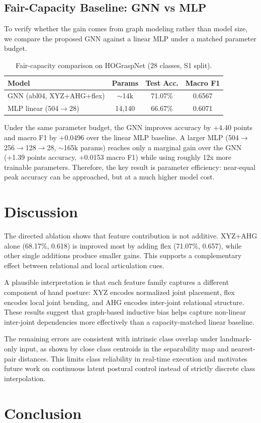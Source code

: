 \documentclass[letterpaper, 10 pt, conference]{ieeeconf}  %
\begin{document}
\subsection{Fair-Capacity Baseline: GNN vs MLP}

To verify whether the gain comes from graph modeling rather than model size, we compare the proposed GNN against a linear MLP under a matched parameter budget.

\begin{table}[h]
\centering
\caption{Fair-capacity comparison on HOGraspNet (28 classes, S1 split).}
\label{tab:fair_capacity}
\begin{tabular}{lccc}
\toprule
Model & Params & Test Acc. & Macro F1 \\
\midrule
GNN (abl04, XYZ+AHG+flex) & \(\sim\)14k & 71.07\% & 0.6567 \\
MLP linear (504\(\rightarrow\)28) & 14,140 & 66.67\% & 0.6071 \\
\bottomrule
\end{tabular}
\end{table}

Under the same parameter budget, the GNN improves accuracy by +4.40 points and macro F1 by +0.0496 over the linear MLP baseline. A larger MLP (504\(\rightarrow\)256\(\rightarrow\)128\(\rightarrow\)28, \(\sim\)165k params) reaches only a marginal gain over the GNN (+1.39 points accuracy, +0.0153 macro F1) while using roughly 12x more trainable parameters. Therefore, the key result is parameter efficiency: near-equal peak accuracy can be approached, but at a much higher model cost.

\section{Discussion}

The directed ablation shows that feature contribution is not additive. XYZ+AHG alone (68.17\%, 0.618) is improved most by adding flex (71.07\%, 0.657), while other single additions produce smaller gains. This supports a complementary effect between relational and local articulation cues.

A plausible interpretation is that each feature family captures a different component of hand posture: XYZ encodes normalized joint placement, flex encodes local joint bending, and AHG encodes inter-joint relational structure. These results suggest that graph-based inductive bias helps capture non-linear inter-joint dependencies more effectively than a capacity-matched linear baseline.

The remaining errors are consistent with intrinsic class overlap under landmark-only input, as shown by close class centroids in the separability map and nearest-pair distances. This limits class reliability in real-time execution and motivates future work on continuous latent postural control instead of strictly discrete class interpolation.

\section{Conclusion}



\end{document}
